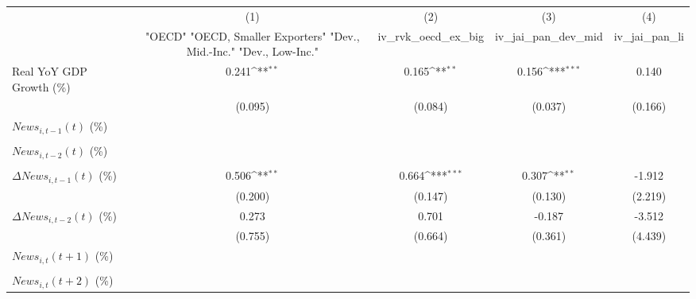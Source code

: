 {
\def\sym#1{\ifmmode^{#1}\else\(^{#1}\)\fi}
\begin{tabular}{l*{4}{c}}
\toprule
                    &\multicolumn{1}{c}{(1)}&\multicolumn{1}{c}{(2)}&\multicolumn{1}{c}{(3)}&\multicolumn{1}{c}{(4)}\\
                    &\multicolumn{1}{c}{ "OECD" "OECD, Smaller Exporters" "Dev., Mid.-Inc." "Dev., Low-Inc."}&\multicolumn{1}{c}{iv_rvk_oecd_ex_big}&\multicolumn{1}{c}{iv_jai_pan_dev_mid}&\multicolumn{1}{c}{iv_jai_pan_li}\\
\midrule
Real YoY GDP Growth (\%)&       0.241\sym{**} &       0.165\sym{**} &       0.156\sym{***}&       0.140         \\
                    &     (0.095)         &     (0.084)         &     (0.037)         &     (0.166)         \\
\addlinespace
$ News_{i,t-1}(t)$ (\%)&                     &                     &                     &                     \\
                    &                     &                     &                     &                     \\
\addlinespace
$ News_{i,t-2}(t)$ (\%)&                     &                     &                     &                     \\
                    &                     &                     &                     &                     \\
\addlinespace
$ \Delta News_{i,t-1}(t)$ (\%)&       0.506\sym{**} &       0.664\sym{***}&       0.307\sym{**} &      -1.912         \\
                    &     (0.200)         &     (0.147)         &     (0.130)         &     (2.219)         \\
\addlinespace
$ \Delta News_{i,t-2}(t)$ (\%)&       0.273         &       0.701         &      -0.187         &      -3.512         \\
                    &     (0.755)         &     (0.664)         &     (0.361)         &     (4.439)         \\
\addlinespace
$ News_{i,t}(t+1)$ (\%)&                     &                     &                     &                     \\
                    &                     &                     &                     &                     \\
\addlinespace
$ News_{i,t}(t+2)$ (\%)&                     &                     &                     &                     \\

\end{tabular}}
